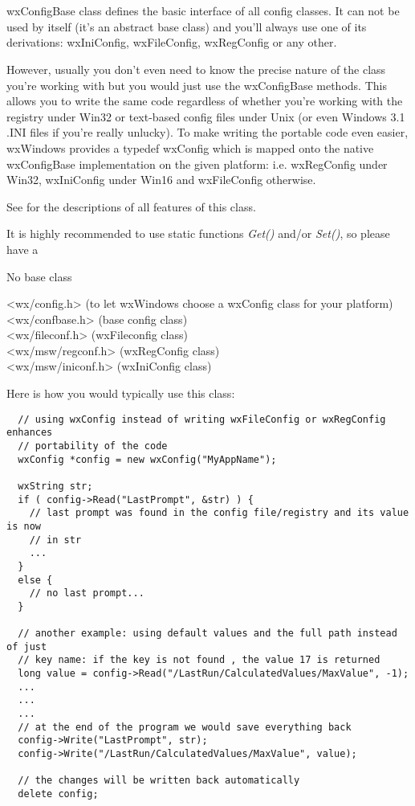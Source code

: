 \section{}\label{wxconfigbase}

wxConfigBase class defines the basic interface of all config classes. It can
not be used by itself (it's an abstract base class) and you'll always use one
of its derivations: wxIniConfig, wxFileConfig, wxRegConfig or any other.

However, usually you don't even need to know the precise nature of the class
you're working with but you would just use the wxConfigBase methods. This
allows you to write the same code regardless of whether you're working with
the registry under Win32 or text-based config files under Unix (or even
Windows 3.1 .INI files if you're really unlucky). To make writing the portable
code even easier, wxWindows provides a typedef wxConfig
which is mapped onto the native wxConfigBase implementation on the given
platform: i.e. wxRegConfig under Win32, wxIniConfig under Win16 and
wxFileConfig otherwise.

See  for the descriptions of all
features of this class.

It is highly recommended to use static functions {\it Get()} and/or {\it Set()}, 
so please have a 


No base class


<wx/config.h> (to let wxWindows choose a wxConfig class for your platform)\\
<wx/confbase.h> (base config class)\\
<wx/fileconf.h> (wxFileconfig class)\\
<wx/msw/regconf.h> (wxRegConfig class)\\
<wx/msw/iniconf.h> (wxIniConfig class)


Here is how you would typically use this class:

\begin{verbatim}
  // using wxConfig instead of writing wxFileConfig or wxRegConfig enhances
  // portability of the code
  wxConfig *config = new wxConfig("MyAppName");

  wxString str;
  if ( config->Read("LastPrompt", &str) ) {
    // last prompt was found in the config file/registry and its value is now
    // in str
    ...
  }
  else {
    // no last prompt...
  }

  // another example: using default values and the full path instead of just
  // key name: if the key is not found , the value 17 is returned
  long value = config->Read("/LastRun/CalculatedValues/MaxValue", -1);
  ...
  ...
  ...
  // at the end of the program we would save everything back
  config->Write("LastPrompt", str);
  config->Write("/LastRun/CalculatedValues/MaxValue", value);

  // the changes will be written back automatically
  delete config;
\end{verbatim}

